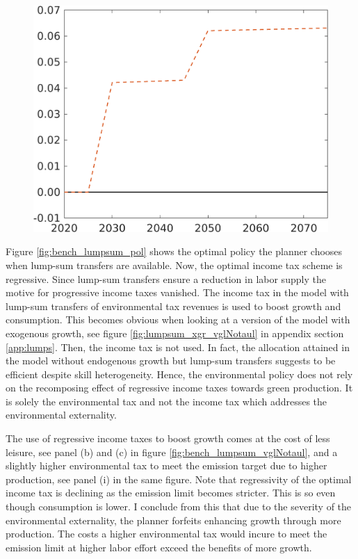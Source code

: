 \begin{figure}[h!!]
\begin{minipage}[]{0.32\textwidth}
	\end{minipage}
	\begin{minipage}[]{0.32\textwidth}
		\includegraphics[width=1\textwidth]{../../codding_model/own_basedOnFried/optimalPol_190722_tidiedUp/figures/all_July22/comp_notaul4_OPT_T_NoTaus_Tls_spillover0_noskill0_sep1_xgrowth0_etaa0.79_lgd0.png}
	\end{minipage}
\end{figure}


Figure \ref{fig:bench_lumpsum_pol} shows the optimal policy the planner chooses when lump-sum transfers are available. 
Now, the optimal income tax scheme is regressive. Since lump-sum transfers ensure a reduction in labor supply the motive for progressive income taxes vanished.
The income tax in the model with lump-sum transfers of environmental tax revenues is used to boost growth and consumption. This becomes obvious when looking at a version of the model with exogenous growth, see figure \ref{fig:lumpsum_xgr_vglNotaul} in appendix section \ref{app:lumps}. Then, the income tax is not used. In fact, the allocation attained in the model without endogenous growth but lump-sum transfers suggests to be efficient despite skill heterogeneity. Hence, the environmental policy does not rely on the recomposing effect of regressive income taxes towards green production. It is solely the environmental tax and not the income tax which addresses the environmental externality. 

The use of regressive income taxes to boost growth comes at the cost of less leisure, see panel (b) and (c) in figure \ref{fig:bench_lumpsum_vglNotaul}, and a slightly higher environmental tax to meet the emission target due to higher production, see panel (i) in the same figure. Note that regressivity of the optimal income tax is declining as the emission limit becomes stricter. This is so even though consumption is lower. I conclude from this that due to the severity of the environmental externality, the planner forfeits enhancing growth through more production. The costs a higher environmental tax would incure to meet the emission limit at higher labor effort exceed the benefits of more growth. 

